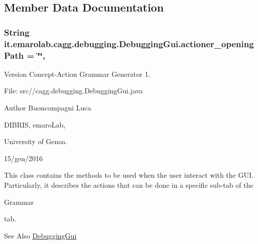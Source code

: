\subsection{Member Data Documentation}
\hypertarget{classit_1_1emarolab_1_1cagg_1_1debugging_1_1DebuggingGui_a609ea4e6e07848461ed41d9bcfbc9e9d}{
\subsubsection[{actioner\-\_\-opening\-Path}]{\setlength{\rightskip}{0pt plus 5cm}String it.\-emarolab.\-cagg.\-debugging.\-Debugging\-Gui.\-actioner\-\_\-opening\-Path = \char`\"{}\char`\"{}\hspace{0.3cm}{\ttfamily [static]}, {\ttfamily [private]}}}\label{classit_1_1emarolab_1_1cagg_1_1debugging_1_1DebuggingGui_a609ea4e6e07848461ed41d9bcfbc9e9d}
\begin{DoxyVersion}{Version}
Concept-\/\-Action Grammar Generator 1. \par
 File\-: src//cagg.debugging.\-Debugging\-Gui.\-java \par

\end{DoxyVersion}
\begin{DoxyAuthor}{Author}
Buoncompagni Luca \par
 D\-I\-B\-R\-I\-S, emaro\-Lab,\par
 University of Genoa. \par
 15/gen/2016 \par

\end{DoxyAuthor}


This class contains the methods to be used when the user interact with the G\-U\-I. Particularly, it describes the actions that can be done in a specific sub-\/tab of the
\begin{DoxyCode}
Grammar 
\end{DoxyCode}
 tab. 

\begin{DoxySeeAlso}{See Also}
\hyperlink{classit_1_1emarolab_1_1cagg_1_1debugging_1_1DebuggingGui}{Debugging\-Gui} 
\end{DoxySeeAlso}


